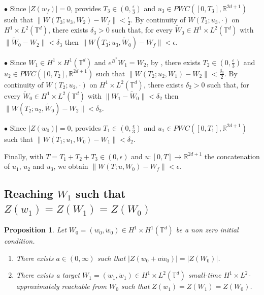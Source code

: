\documentclass[a4paper]{article}
\theoremstyle{plain}
\newtheorem{proposition}[theorem]{Proposition}
\newcommand{\T}{\mathbb{T}}
\newcommand{\R}{\mathbb{R}}
\begin{document}
\noindent $\bullet$ Since $|Z(w_f)|=0$,  provides $T_3 \in (0,\frac{\epsilon}{3})$ and $u_3 \in PWC([0,T_3],\R^{2d+1})$ such that
$\| W(T_3;u_3,W_2)-W_f\|<\frac{\epsilon}{2}$. By continuity of $W(T_3;u_3,\cdot)$ on $H^1 \times L^2(\T^d)$, there exists $\delta_3>0$ such that, for every $\widetilde{W}_0 \in H^1 \times L^2(\T^d)$ with $\|\widetilde{W}_0-W_2\|<\delta_3$ then $\| W(T_3;u_3,\widetilde{W}_0)-W_f\|<\epsilon$.

\medskip

\noindent $\bullet$ Since $W_1 \in H^1 \times H^1(\T^d)$ and $e^{B^*}W_1=W_2$, by , there exists $T_2 \in (0,\frac{\epsilon}{3})$ and $u_2 \in PWC([0,T_2],\R^{2d+1})$ such that
$\| W(T_2;u_2,W_1)- W_2\|<\frac{\delta_3}{2}$.
By continuity of $W(T_2;u_2,\cdot)$ on $H^1 \times L^2(\T^d)$, there exists $\delta_2>0$ such that, for every $\widetilde{W}_0 \in H^1 \times L^2(\T^d)$ with $\|W_1-\widetilde{W}_0\|<\delta_2$ then $\| W(T_2;u_2,\widetilde{W}_0)-W_2\|<\delta_3$.

\medskip

\noindent $\bullet$ Since $|Z(w_0)|=0$,  provides $T_1 \in (0,\frac{\epsilon}{3})$ and $u_1 \in PWC([0,T_1],\R^{2d+1})$ such that
$\| W(T_1;u_1,W_0)-W_1\|<\delta_2$.

\medskip

Finally, with $T=T_1+T_2+T_3 \in (0,\epsilon)$ and $u:[0,T] \to \R^{2d+1}$ the concatenation of $u_1$, $u_2$ and $u_3$, we obtain
$\|W(T;u,W_0)-W_f\|<\epsilon$.

\subsection{Reaching $W_1$ such that $Z(w_1)=Z(W_1)=Z(W_0)$}    
\label{subsec:W1}

\begin{proposition} \label{Lem:w0+aw0.}
Let $W_0=(w_0,\dot{w}_0) \in H^1 \times H^1(\T^d)$ be a non zero initial condition. 
\begin{enumerate}[topsep=0cm, parsep=0cm, itemsep=0cm]
\item  There exists $a \in (0,\infty)$ such that $|Z(w_0+a\dot{w}_0)|=|Z(W_0)|$.
%
\item There exists a target $W_1=(w_1,\dot{w}_1) \in H^1 \times L^2(\T^d)$ small-time $H^1 \times L^2$-approximately reachable from $W_0$ such that $Z(w_1)=Z(W_1)=Z(W_0)$.
\end{enumerate}
\end{proposition}
    
\end{document}
